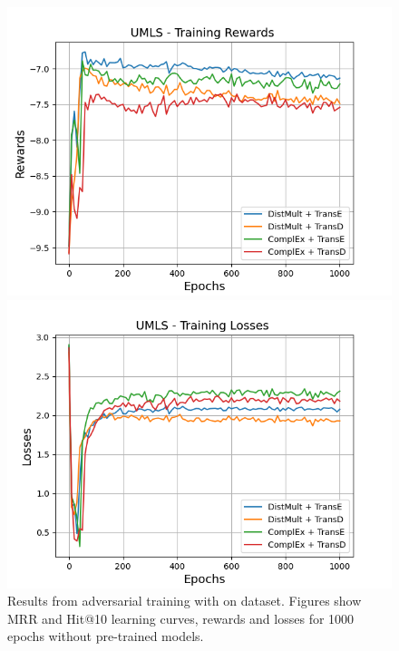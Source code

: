\begin{figure}[H]
    \begin{minipage}{.5\textwidth}
      \centering
      \includegraphics[width=\linewidth]{figures/results/gan_train/not_pretrained/uncertainty/max/entropy/umls/1k_epochs/uncertainty_umls_rew.png}
    \end{minipage}%
     \begin{minipage}{.5\textwidth}
      \centering
      \includegraphics[width=\linewidth]{figures/results/gan_train/not_pretrained/uncertainty/max/entropy/umls/1k_epochs/uncertainty_umls_losses.png}
    \end{minipage}%
    \caption{Results from adversarial training with \usmax on \umls dataset.
    Figures show MRR and Hit@10 learning curves, rewards and losses for 1000 epochs without pre-trained models.}
    \label{fig:gan_train_not_pretrained_usmax_umls}
\end{figure}
